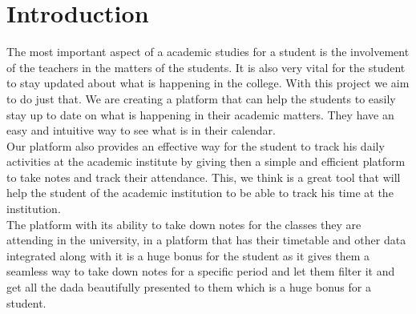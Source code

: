 \chapter{Introduction}

\vspace{1em}
The most important aspect of a academic studies for a student is the involvement of the teachers in the matters of the students. It is also very vital for the student to stay updated about what is happening in the college. With this project we aim to do just that. We are creating a platform that can help the students to easily stay up to date on what is happening in their academic matters. They have an easy and intuitive way to see what is in their calendar.\\

\vspace{1em}
Our platform also provides an effective way for the student to track his daily activities at the academic institute by giving then a simple and efficient platform to take notes and track their attendance. This, we think is a great tool that will help the student of the academic institution to be able to track his time at the institution.\\

\vspace{1em}
The platform with its ability to take down notes for the classes they are attending in the university, in a platform that has their timetable and other data integrated along with it is a huge bonus for the student as it gives them a seamless way to take down notes for a specific period and let them filter it and get all the dada beautifully presented to them which is a huge bonus for a student.
